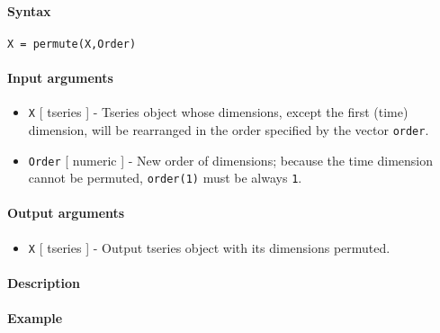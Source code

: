 


	\paragraph{Syntax}

\begin{verbatim}
X = permute(X,Order)
\end{verbatim}

\paragraph{Input arguments}

\begin{itemize}
\item
  \texttt{X} {[} tseries {]} - Tseries object whose dimensions, except
  the first (time) dimension, will be rearranged in the order specified
  by the vector \texttt{order}.
\item
  \texttt{Order} {[} numeric {]} - New order of dimensions; because the
  time dimension cannot be permuted, \texttt{order(1)} must be always
  \texttt{1}.
\end{itemize}

\paragraph{Output arguments}

\begin{itemize}
\itemsep1pt\parskip0pt
\item
  \texttt{X} {[} tseries {]} - Output tseries object with its dimensions
  permuted.
\end{itemize}

\paragraph{Description}

\paragraph{Example}


